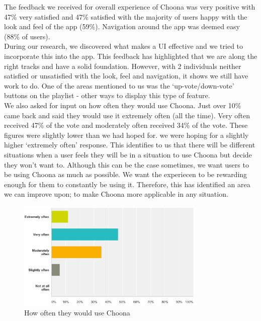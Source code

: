 The feedback we received for overall experience of Choona was very positive with 47\% very satisfied and 47\% satisfied with the majority of users happy with the look and feel of the app (59\%).  Navigation around the app was deemed easy (88\% of users).  \\
During our research, we discovered what makes a UI effective and we tried to incorporate this into the app.  This feedback has highlighted that we are along the right tracks and have a solid foundation.  However, with 2 individuals neither satisfied or unsatisfied with the look, feel and navigation, it shows we still have work to do.  One of the areas mentioned to us was the `up-vote/down-vote' buttons on the playlist - other ways to display this type of feature.  \\

We also asked for input on how often they would use Choona.  Just over 10\% came back and said they would use it extremely often (all the time).  Very often received 47\% of the vote and moderately often received 34\% of the vote.  These figures were slightly lower than we had hoped for.  we were hoping for a slightly higher `extremely often' response.  This identifies to us that there will be different situations when a user feels they will be in a situation to use Choona but decide they won't want to.  Although this can be the case sometimes, we want users to be using Choona as much as possible.  We want the experiecen to be rewarding enough for them to constantly be using it.  Therefore, this has identified an area we can improve upon; to make Choona more applicable in any situation.  \\

    \begin{figure}[h!]
      \centering
      \includegraphics[width=0.8\textwidth]{./img/how_often.png}
      \caption{How often they would use Choona}
      \label{fig:how_often}
    \end{figure}

